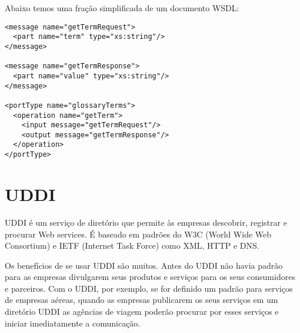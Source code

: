Abaixo temos uma fração simplificada de um documento WSDL:

\lstset{language=XML}
\begin{lstlisting}[caption={WSDL},frame=trBL,breaklines=true,label=listing:wsdl]
<message name="getTermRequest">
  <part name="term" type="xs:string"/>
</message>

<message name="getTermResponse">
  <part name="value" type="xs:string"/>
</message>

<portType name="glossaryTerms">
  <operation name="getTerm">
    <input message="getTermRequest"/>
    <output message="getTermResponse"/>
  </operation>
</portType> 
\end{lstlisting}

\section{UDDI}

UDDI é um serviço de diretório que permite às empresas descobrir, registrar e procurar Web services. É baseado em padrões do W3C (World Wide Web Consortium) e IETF (Internet Task Force) como XML, HTTP e DNS.

Os benefícios de se usar UDDI são muitos. Antes do UDDI não havia padrão para as empresas divulgarem seus produtos e serviços para os seus consumidores e parceiros. Com o UDDI, por exemplo, se for definido um padrão para serviços de empresas aéreas, quando as empresas publicarem os seus serviços em um diretório UDDI as agências de viagem poderão procurar por esses serviços e iniciar imediatamente a comunicação.












